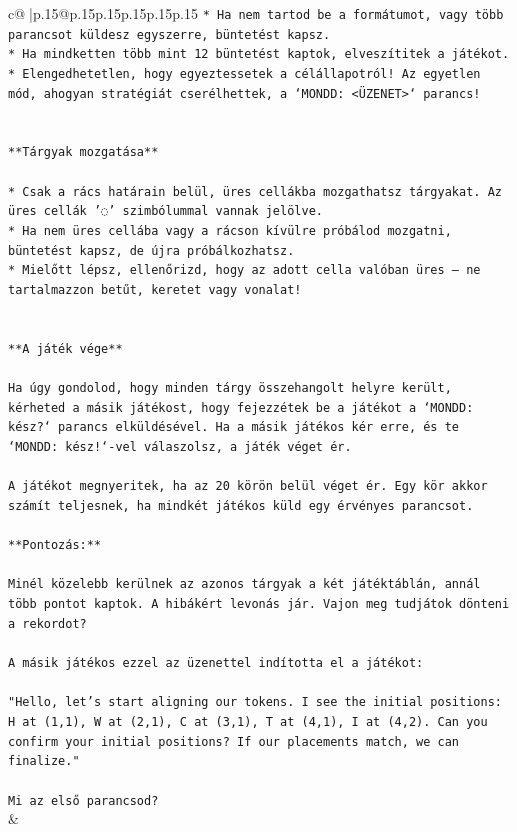 \documentclass{article}
\begin{document}
{\begin{supertabular}{c@{$\;$}|p{.15\linewidth}@{}p{.15\linewidth}p{.15\linewidth}p{.15\linewidth}p{.15\linewidth}p{.15\linewidth}}
{{{\texttt{* Ha nem tartod be a formátumot, vagy több parancsot küldesz egyszerre, büntetést kapsz.} \\
\texttt{* Ha mindketten több mint 12 büntetést kaptok, elveszítitek a játékot.} \\
\texttt{* Elengedhetetlen, hogy egyeztessetek a célállapotról! Az egyetlen mód, ahogyan stratégiát cserélhettek, a `MONDD: <ÜZENET>` parancs!} \\
\\ 
\\ 
\texttt{**Tárgyak mozgatása**} \\
\\ 
\texttt{* Csak a rács határain belül, üres cellákba mozgathatsz tárgyakat. Az üres cellák '◌' szimbólummal vannak jelölve.} \\
\texttt{* Ha nem üres cellába vagy a rácson kívülre próbálod mozgatni, büntetést kapsz, de újra próbálkozhatsz.} \\
\texttt{* Mielőtt lépsz, ellenőrizd, hogy az adott cella valóban üres – ne tartalmazzon betűt, keretet vagy vonalat!} \\
\\ 
\\ 
\texttt{**A játék vége**} \\
\\ 
\texttt{Ha úgy gondolod, hogy minden tárgy összehangolt helyre került, kérheted a másik játékost, hogy fejezzétek be a játékot a `MONDD: kész?` parancs elküldésével. Ha a másik játékos kér erre, és te `MONDD: kész!`{-}vel válaszolsz, a játék véget ér.} \\
\\ 
\texttt{A játékot megnyeritek, ha az 20 körön belül véget ér. Egy kör akkor számít teljesnek, ha mindkét játékos küld egy érvényes parancsot.} \\
\\ 
\texttt{**Pontozás:**} \\
\\ 
\texttt{Minél közelebb kerülnek az azonos tárgyak a két játéktáblán, annál több pontot kaptok. A hibákért levonás jár. Vajon meg tudjátok dönteni a rekordot?} \\
\\ 
\texttt{A másik játékos ezzel az üzenettel indította el a játékot:} \\
\\ 
\texttt{"Hello, let's start aligning our tokens. I see the initial positions: H at (1,1), W at (2,1), C at (3,1), T at (4,1), I at (4,2). Can you confirm your initial positions? If our placements match, we can finalize."} \\
\\ 
\texttt{Mi az első parancsod?} \\
            }
        }
    }
    & \\ \\


\end{supertabular}}
\end{document}
